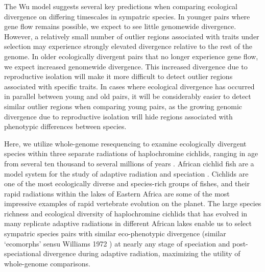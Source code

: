 The Wu model suggests several key predictions when comparing ecological divergence on differing timescales in sympatric species. In younger pairs where gene flow remains possible, we expect to see little genomewide divergence. However, a relatively small number of outlier regions associated with traits under selection may experience strongly elevated divergence relative to the rest of the genome. In older ecologically divergent pairs that no longer experience gene flow, we expect increased genomewide divergence. This increased divergence due to reproductive isolation will make it more difficult to detect outlier regions associated with specific traits. In cases where ecological divergence has occurred in parallel between young and old pairs, it will be considerably easier to detect similar outlier regions when comparing young pairs, as the growing genomic divergence due to reproductive isolation will hide regions associated with phenotypic differences between species.

Here, we utilize whole-genome resequencing to examine ecologically divergent species within three separate radiations of haplochromine cichlids, ranging in age from several ten thousand to several millions of years \cite{genner2007age}. African cichlid fish are a model system for the study of adaptive radiation and speciation \cite{fryer1972cichlid, seehausen2006african, seehausen2015process}. Cichlids are one of the most ecologically diverse and species-rich groups of fishes, and their rapid radiations within the lakes of Eastern Africa are some of the most impressive examples of rapid vertebrate evolution on the planet. The large species richness and ecological diversity of haplochromine cichlids that has evolved in many replicate adaptive radiations in different African lakes enable us to select sympatric species pairs with similar eco-phenotypic divergence (similar `ecomorphs' sensu Williams 1972 \cite{williams1972origin}) at nearly any stage of speciation and post-speciational divergence during adaptive radiation, maximizing the utility of whole-genome comparisons.

